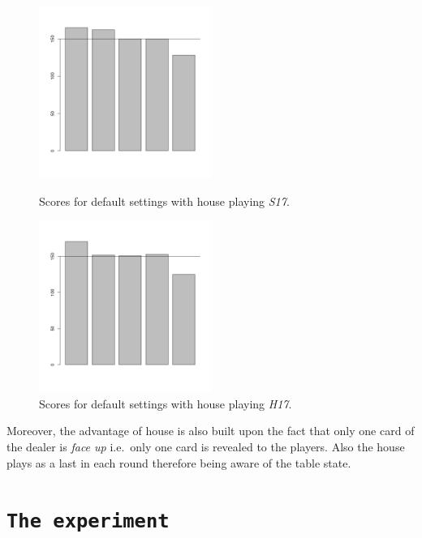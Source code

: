 \documentclass[12pt,a4paper,twocolumn]{article}
\begin{document}
\begin{figure}[htbp]
\centering
\includegraphics[width=0.5\textwidth]{s17}
\caption{Scores for default settings with house playing \emph{S17}.\label{fig:s17}}
\includegraphics[width=0.5\textwidth]{h17}
\caption{Scores for default settings with house playing \emph{H17}.\label{fig:h17}}
\end{figure}

Moreover, the advantage of house is also built upon the fact that only one card of the dealer is \emph{face up} i.e.\ only one card is revealed to the players. Also the house plays as a last in each round therefore being aware of the table state.\\


\section*{\texttt{The experiment}}
\end{document}
